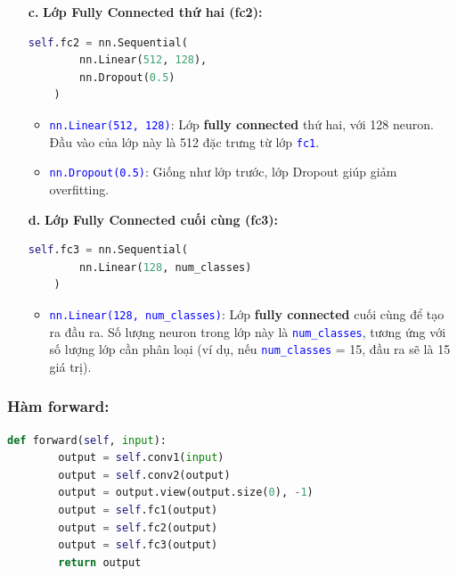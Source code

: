 \begin{itemize}

\item[\textbf{c.}] \textbf{Lớp Fully Connected thứ hai (fc2):}

\begin{lstlisting}[language=python]
    self.fc2 = nn.Sequential(
        nn.Linear(512, 128),
        nn.Dropout(0.5)
    )
\end{lstlisting}

\begin{itemize}
    \item \textcolor{blue}{\texttt{nn.Linear(512, 128)}}: Lớp \textbf{fully connected} thứ hai, với 128 neuron. Đầu vào của lớp này là 512 đặc trưng từ lớp \textcolor{blue}{\texttt{fc1}}.
    \item \textcolor{blue}{\texttt{nn.Dropout(0.5)}}: Giống như lớp trước, lớp Dropout giúp giảm overfitting.
\end{itemize}

\item[\textbf{d.}] \textbf{Lớp Fully Connected cuối cùng (fc3):}

\begin{lstlisting}[language=python]
    self.fc3 = nn.Sequential(
        nn.Linear(128, num_classes)
    )
\end{lstlisting}

\begin{itemize}
    \item \textcolor{blue}{\texttt{nn.Linear(128, num\_classes)}}: Lớp \textbf{fully connected} cuối cùng để tạo ra đầu ra. Số lượng neuron trong lớp này là \textcolor{blue}{\texttt{num\_classes}}, tương ứng với số lượng lớp cần phân loại (ví dụ, nếu \textcolor{blue}{\texttt{num\_classes}} = 15, đầu ra sẽ là 15 giá trị).
\end{itemize}

\end{itemize}
    
\subsubsection{Hàm forward:}

\begin{lstlisting}[language=python]
    def forward(self, input):
        output = self.conv1(input)
        output = self.conv2(output)
        output = output.view(output.size(0), -1)
        output = self.fc1(output)
        output = self.fc2(output)
        output = self.fc3(output)
        return output
\end{lstlisting}

